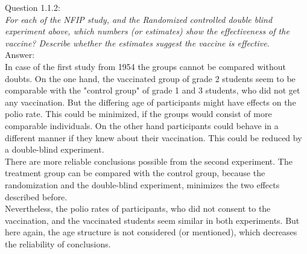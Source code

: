 
Question 1.1.2:\\	
\textsl{For each of the NFIP study, and the Randomized controlled double blind experiment above, which numbers (or estimates) show the effectiveness of the vaccine? Describe whether the estimates suggest the vaccine is effective.}\\

Answer:\\
In case of the first study from 1954 the groups cannot be compared without doubts. On the one hand, the vaccinated group of grade 2 students seem to be comparable with the "control group" of grade 1 and 3 students, who did not get any vaccination. But the differing age of participants might have effects on the polio rate. This could be minimized, if the groups would consist of more comparable individuals. On the other hand participants could behave in a different manner if they knew about their vaccination. This could be reduced by a double-blind experiment.\\

There are more reliable conclusions possible from the second experiment. The treatment group can be compared with the control group, because the randomization and the double-blind experiment, minimizes the two effects described before.\\

Nevertheless, the polio rates of participants, who did not consent to the vaccination, and the vaccinated students seem similar in both experiments. But here again, the age structure is not considered (or mentioned), which decreases the reliability of conclusions.\\